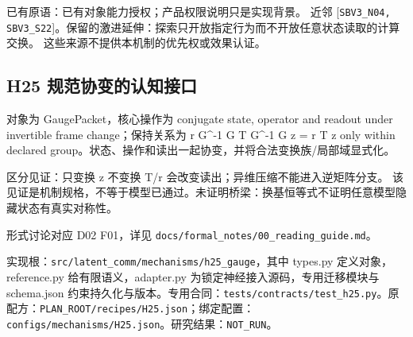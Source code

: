 \documentclass[
  10pt,
]{article}
\begin{document}
已有原语：已有对象能力授权；产品权限说明只是实现背景。 近邻
{[}\nolinkurl{SBV3_N04,}
\nolinkurl{SBV3_S22}{]}。保留的激进延伸：探索只开放指定行为而不开放任意状态读取的计算交换。
这些来源不提供本机制的优先权或效果认证。

\subsection{H25
规范协变的认知接口}\label{h25-ux89c4ux8303ux534fux53d8ux7684ux8ba4ux77e5ux63a5ux53e3}

对象为 GaugePacket，核心操作为 conjugate state, operator and readout
under invertible frame change；保持关系为 r G\^{}-1 G T G\^{}-1 G z = r
T z only within declared
group。状态、操作和读出一起协变，并将合法变换族/局部域显式化。

区分见证：只变换 z 不变换 T/r 会改变读出；异维压缩不能进入逆矩阵分支。
该见证是机制规格，不等于模型已通过。未证明桥梁：换基恒等式不证明任意模型隐藏状态有真实对称性。

形式讨论对应 D02 F01，详见
{\small\nolinkurl{docs/formal_notes/00_reading_guide.md}}。

实现根：{\small\nolinkurl{src/latent_comm/mechanisms/h25_gauge}}，其中
types.py 定义对象，reference.py 给有限语义，adapter.py
为锁定神经接入源码，专用迁移模块与 schema.json
约束持久化与版本。专用合同：{\small\nolinkurl{tests/contracts/test_h25.py}}。原配方：{\small\nolinkurl{PLAN_ROOT/recipes/H25.json}}；绑定配置：{\small\nolinkurl{configs/mechanisms/H25.json}}。研究结果：\nolinkurl{NOT_RUN}。
\end{document}
